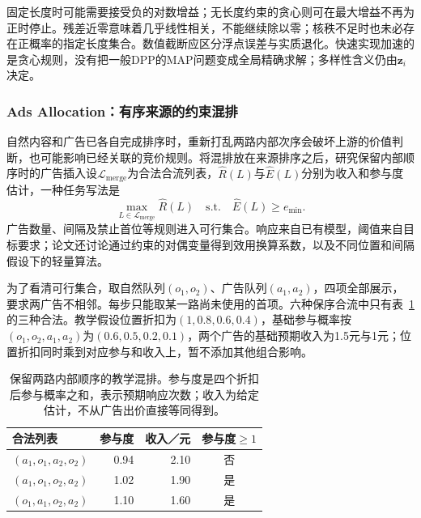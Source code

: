 固定长度时可能需要接受负的对数增益；无长度约束的贪心则可在最大增益不再为正时停止。残差近零意味着几乎线性相关，不能继续除以零；核秩不足时也未必存在正概率的指定长度集合。数值截断应区分浮点误差与实质退化。快速实现加速的是贪心规则，没有把一般DPP的MAP问题变成全局精确求解；多样性含义仍由$\bm z_i$决定。

\subsubsection{Ads Allocation：有序来源的约束混排}
\label{sec:rs-ads-allocation}

自然内容和广告已各自完成排序时，重新打乱两路内部次序会破坏上游的价值判断，也可能影响已经关联的竞价规则。将混排放在来源排序之后，研究保留内部顺序时的广告插入设$\mathcal L_{\mathrm{merge}}$为合法合流列表，$\widehat R(L)$与$\widehat E(L)$分别为收入和参与度估计，一种任务写法是
\begin{equation}
 \max_{L\in\mathcal L_{\mathrm{merge}}}\widehat R(L)
 \quad\text{s.t.}\quad \widehat E(L)\geq e_{\min}.
 \label{eq:rs-ads-allocation}
\end{equation}
广告数量、间隔及禁止首位等规则进入可行集合。响应来自已有模型，阈值来自目标要求；论文还讨论通过约束的对偶变量得到效用换算系数，以及不同位置和间隔假设下的轻量算法。

为了看清可行集合，取自然队列$(o_1,o_2)$、广告队列$(a_1,a_2)$，四项全部展示，要求两广告不相邻。每步只能取某一路尚未使用的首项。六种保序合流中只有表~\ref{tab:rs-merge-example}的三种合法。教学假设位置折扣为$(1,0.8,0.6,0.4)$，基础参与概率按$(o_1,o_2,a_1,a_2)$为$(0.6,0.5,0.2,0.1)$，两个广告的基础预期收入为1.5元与1元；位置折扣同时乘到对应参与和收入上，暂不添加其他组合影响。

\begin{table}[htbp]
 \centering\small
 \begin{tabular}{@{}lrrc@{}}
  \toprule
  合法列表 & 参与度 & 收入／元 & 参与度$\geq1$\\
  \midrule
  $(a_1,o_1,a_2,o_2)$ & 0.94 & 2.10 & 否\\
  $(a_1,o_1,o_2,a_2)$ & 1.02 & 1.90 & 是\\
  $(o_1,a_1,o_2,a_2)$ & 1.10 & 1.60 & 是\\
  \bottomrule
 \end{tabular}
 \caption{保留两路内部顺序的教学混排。参与度是四个折扣后参与概率之和，表示预期响应次数；收入为给定估计，不从广告出价直接等同得到。}
 \label{tab:rs-merge-example}
\end{table}


